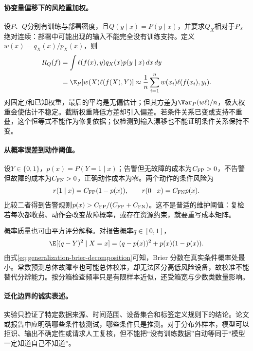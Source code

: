 \paragraph{协变量偏移下的风险重加权。}
设$P$、$Q$分别有训练与部署密度，且$Q(y\mid x)=P(y\mid x)$，并要求$Q_X$相对于$P_X$绝对连续：部署中可能出现的输入不能完全没有训练支持。定义$w(x)=q_X(x)/p_X(x)$，则
\begin{align}
 R_Q(f)&=\int\ell(f(x),y)q_X(x)p(y\mid x)\,dx\,dy\\
 &=\E_P[w(X)\ell(f(X),Y)]
 \approx\frac1n\sum_{i=1}^nw(x_i)\ell(f(x_i),y_i).
\end{align}
对固定$f$和已知权重，最后的平均是无偏估计；但其方差为$\Var_P(w\ell)/n$，极大权重会使估计不稳定。截断权重降低方差却引入偏差。若条件关系已变或支持不重叠，这个恒等式不能作为修复依据；仅检测到输入漂移也不能证明条件关系保持不变。

\paragraph{从概率误差到动作阈值。}
设$Y\in\{0,1\}$，$p(x)=P(Y=1\mid x)$；告警但无故障的成本为$C_{\rm FP}>0$，不告警但故障的成本为$C_{\rm FN}>0$，正确动作成本为零。两个动作的条件风险为
\begin{equation}
 r(1\mid x)=C_{\rm FP}(1-p(x)),\qquad
 r(0\mid x)=C_{\rm FN}p(x).
\end{equation}
比较二者得到告警规则$p(x)>C_{\rm FP}/(C_{\rm FP}+C_{\rm FN})$。这不是普适的维护阈值：复检若每次都收费、动作会改变故障概率，或存在资源约束，就要重写成本矩阵。

概率质量也可由平方评分解释。对报告概率$q\in[0,1]$，
\begin{equation}
 \E[(q-Y)^2\mid X=x]=(q-p(x))^2+p(x)(1-p(x)).\label{eq:generalization-brier-decomposition}
\end{equation}
由式\eqref{eq:generalization-brier-decomposition}可知，Brier 分数在真实条件概率处最小。常数预测总体故障率也可能总体校准，却无法区分高低风险设备，故校准不能替代分辨能力。按分箱检查频率只是有限样本近似，还受箱宽与少数类数量影响。

\paragraph{泛化边界的诚实表述。}
实验只验证了特定数据来源、时间范围、设备集合和标签定义规则下的结论。论文或报告中应明确哪些条件被测试，哪些条件只是推测。对于分布外样本，模型可以拒识、输出不确定性或请求人工复核，但不能把“没有训练数据”自动等同于“模型一定知道自己不知道”。

